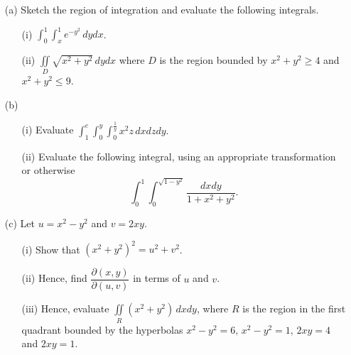 \documentclass[12pt]{uz-exame}
\begin{document}
\begin{question}
\begin{itemize}
\item[(a)] Sketch the region of integration and evaluate the following integrals.
\begin{itemize}
\item[(i)] $\displaystyle \int _0^1 \int _{x}^{1}e^{-y^2} \, dydx$.
\item[(ii)] $\displaystyle \iint \limits _D \sqrt{x^2+y^2}\, dydx$ where $D$ is the region bounded by $x^2+y^2\geq 4$ and\\ $x^2+y^2\leq 9$. 
\end{itemize}
\item[(b)] \begin{itemize}
\item[(i)] Evaluate $\displaystyle \int _1^e\int _0^y \int _{0}^{\frac{1}{y}} x^2z\, dxdzdy.$ 
\item[(ii)] Evaluate the following integral, using an appropriate transformation or otherwise \[\int _0^1 \int _0^{\sqrt{1-y^2}} \dfrac{dxdy}{1+x^2+y^2}.\] 
\end{itemize}
\item[(c)] Let $u=x^2-y^2$ and $v=2xy$.
\begin{itemize}
\item[(i)] Show that $(x^2+y^2)^2=u^2+v^2$. 
\item[(ii)] Hence, find $\dfrac{\partial (x,y)}{\partial (u,v)}$ in terms of $u$ and $v$. 
\item[(iii)] Hence, evaluate  $\displaystyle \iint \limits _{R} (x^2+y^2)\, dxdy$, where $R$ is the region in the first quadrant  bounded by the hyperbolas $x^2-y^2=6, \, x^2-y^2=1, \, 2xy=4 $ and $2xy=1$. 
\end{itemize}
\end{itemize}
\end{question}
\end{document}
